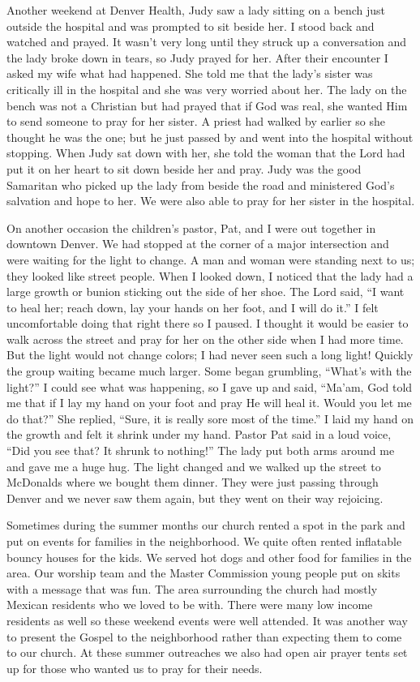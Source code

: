 \documentclass[oneside]{book}
\begin{document}
Another weekend at Denver Health, Judy saw a lady sitting on a bench just outside the hospital and was prompted to sit beside her. I stood back and watched and prayed. It wasn’t very long until they struck up a conversation and the lady broke down in tears, so Judy prayed for her. After their encounter I asked my wife what had happened. She told me that the lady’s sister was critically ill in the hospital and she was very worried about her. The lady on the bench was not a Christian but had prayed that if God was real, she wanted Him to send someone to pray for her sister. A priest had walked by earlier so she thought he was the one; but he just passed by and went into the hospital without stopping. When Judy sat down with her, she told the woman that the Lord had put it on her heart to sit down beside her and pray. Judy was the good Samaritan who picked up the lady from beside the road and ministered God’s salvation and hope to her. We were also able to pray for her sister in the hospital. 


On another occasion the children’s pastor, Pat, and I were out together in downtown Denver. We had stopped at the corner of a major intersection and were waiting for the light to change. A man and woman were standing next to us; they looked like street people. When I looked down, I noticed that the lady had a large growth or bunion sticking out the side of her shoe. The Lord said, “I want to heal her; reach down, lay your hands on her foot, and I will do it.” I felt uncomfortable doing that right there so I paused. I thought it would be easier to walk across the street and pray for her on the other side when I had more time. But the light would not change colors; I had never seen such a long light! Quickly the group waiting became much larger. Some began grumbling, “What’s with the light?” I could see what was happening, so I gave up and said, “Ma’am, God told me that if I lay my hand on your foot and pray He will heal it. Would you let me do that?” She replied, “Sure, it is really sore most of the time.” I laid my hand on the growth and felt it shrink under my hand. Pastor Pat said in a loud voice, “Did you see that? It shrunk to nothing!” The lady put both arms around me and gave me a huge hug. The light changed and we walked up the street to McDonalds where we bought them dinner. They were just passing through Denver and we never saw them again, but they went on their way rejoicing.

Sometimes during the summer months our church rented a spot in the park and put on events for families in the neighborhood. We quite often rented inflatable bouncy houses for the kids. We served hot dogs and other food for families in the area. Our worship team and the Master Commission young people put on skits with a message that was fun. The area surrounding the church had mostly Mexican residents who we loved to be with. There were many low income residents as well so these weekend events were well attended. It was another way to present the Gospel to the neighborhood rather than expecting them to come to our church. At these summer outreaches we also had open air prayer tents set up for those who wanted us to pray for their needs. 
\end{document}
